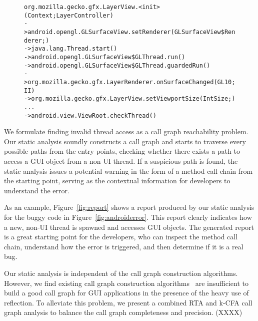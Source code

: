\begin{figure}[t]
\begin{CodeOut}
\begin{alltt}

   org.mozilla.gecko.gfx.LayerView.<init>(Context;LayerController)
-> android.opengl.GLSurfaceView.setRenderer(GLSurfaceView\$Renderer;)
-> java.lang.Thread.start()
-> android.opengl.GLSurfaceView\$GLThread.run()
-> android.opengl.GLSurfaceView\$GLThread.guardedRun()
-> org.mozilla.gecko.gfx.LayerRenderer.onSurfaceChanged(GL10;II)
-> org.mozilla.gecko.gfx.LayerView.setViewportSize(IntSize;)
...
-> android.view.ViewRoot.checkThread()
\end{alltt}
\end{CodeOut}
\vspace*{-2.0ex}  %
\end{figure}

We formulate finding invalid thread access as a call graph reachability
problem. Our static analysis soundly constructs a call graph and starts
to traverse every possible paths from the entry points, checking whether
there exists a path to access a GUI object from a non-UI thread. If 
a suspicious path is found,
the static analysis issues a potential warning in the form of a method
call chain from the starting point, serving as the contextual information
for developers to understand the error.

As an example, Figure~\ref{fig:report} shows a report produced
by our static analysis for the buggy code in Figure~\ref{fig:androiderror}.
This report clearly indicates how a new, non-UI thread is spawned and
accesses GUI objects. 
The generated report is a great starting point for the developers, who can
inspect the method call chain, understand how the error
is triggered, and then determine if it is a real bug.

Our static analysis is independent of the call graph construction algorithms.
However, we find existing call graph construction algorithms~\cite{} are
insufficient to build a good call graph for GUI applications in the presence
of the heavy use of reflection. To alleviate this problem,
we present a combined RTA and k-CFA call graph analysis to balance the call
graph completeness and precision. (XXXX)

